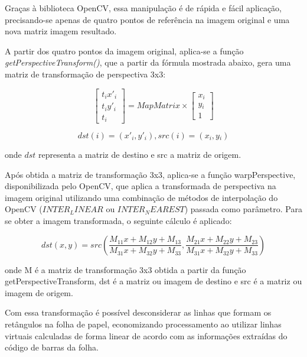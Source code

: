\documentclass[12pt]{report}
\begin{document}
Graças à biblioteca OpenCV, essa manipulação é de rápida e fácil
aplicação, precisando-se apenas de quatro pontos de referência na
imagem original e uma nova matriz imagem resultado.

A partir dos quatro pontos da imagem original, aplica-se a função {\it
  getPerspectiveTransform()}, que a partir da fórmula mostrada abaixo,
gera uma matriz de transformação de perspectiva 3x3:

\begin{equation}
  \begin{bmatrix}
    t{}_i x'{}_i \\
    t{}_i y'{}_i \\
    t{}_i
  \end{bmatrix} = MapMatrix \times
  \begin{bmatrix}
    x{}_i \\
    y{}_i \\
    1
  \end{bmatrix}
\end{equation}

\begin{equation}
  dst(i) = (x'{}_i,y'{}_i), src(i) = (x{}_i,y{}_i)
\end{equation}

\noindent onde $dst$ representa a matriz de destino e src a matriz de
origem.

Após obtida a matriz de transformação 3x3, aplica-se a função
warpPerspective, disponibilizada pelo OpenCV, que aplica a
transformada de perspectiva na imagem original utilizando uma
combinação de métodos de interpolação do OpenCV ({\it $INTER_LINEAR$}
ou {\it $INTER_NEAREST$}) passada como parâmetro. Para se obter a
imagem transformada, o seguinte cálculo é aplicado:

\begin{equation}
  dst(x, y) = src \left(\dfrac{M_{11} x + M_{12} y + M_{13}}{M_{31} x + M_{32} y + M_{33}}, \dfrac{M_{21} x + M_{22} y + M_{23}}{M_{31} x + M_{32} y + M_{33}}\right)
\end{equation}

\noindent onde M é a matriz de transformação 3x3 obtida a partir da
função getPerspectiveTransform, dst é a matriz ou imagem de destino e
src é a matriz ou imagem de origem.

Com essa transformação é possível desconsiderar as linhas que formam
os retângulos na folha de papel, economizando processamento ao
utilizar linhas virtuais calculadas de forma linear de acordo com as
informações extraídas do código de barras da folha.
\end{document}
